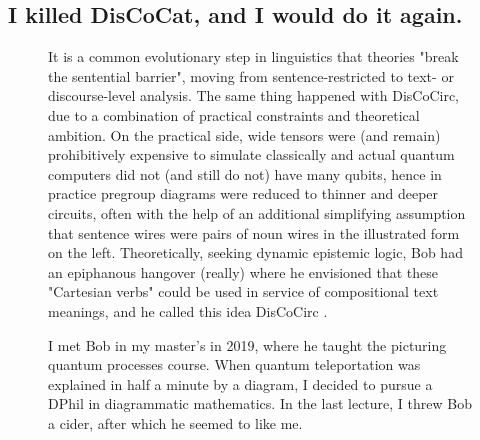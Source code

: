 \subsection{I killed DisCoCat, and I would do it again.}

\begin{figure}[h!]
\centering
{}
\caption{It is a common evolutionary step in linguistics that theories "break the sentential barrier", moving from sentence-restricted to text- or discourse-level analysis. The same thing happened with DisCoCirc, due to a combination of practical constraints and theoretical ambition. On the practical side, wide tensors were (and remain) prohibitively expensive to simulate classically and actual quantum computers did not (and still do not) have many qubits, hence in practice pregroup diagrams were reduced to thinner and deeper circuits, often with the help of an additional simplifying assumption that sentence wires were pairs of noun wires in the illustrated form on the left. Theoretically, seeking dynamic epistemic logic, Bob had an epiphanous hangover (really) where he envisioned that these "Cartesian verbs" could be used in service of compositional text meanings, and he called this idea DisCoCirc \citep{coecke_mathematics_2020}.}
\end{figure}

\begin{figure}[h!]
\centering
{}
\caption{I met Bob in my master's in 2019, where he taught the picturing quantum processes course. When quantum teleportation was explained in half a minute by a diagram, I decided to pursue a DPhil in diagrammatic mathematics. In the last lecture, I threw Bob a cider, after which he seemed to like me.}
\end{figure}
\clearpage

